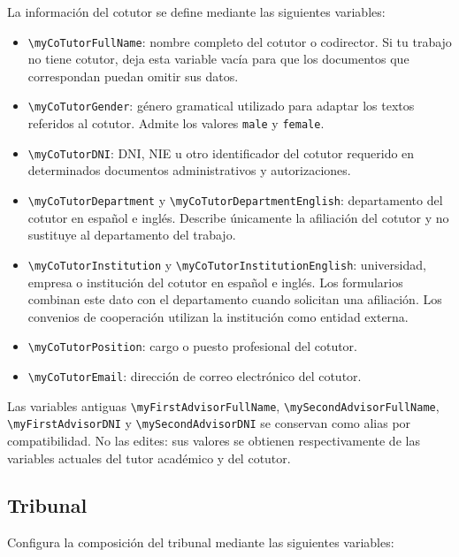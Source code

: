 La información del cotutor se define mediante las siguientes variables:

\begin{itemize}
  \item \texttt{\textbackslash{}myCoTutorFullName}: nombre completo del cotutor o codirector. Si tu trabajo no tiene cotutor, deja esta variable vacía para que los documentos que correspondan puedan omitir sus datos.
  \item \texttt{\textbackslash{}myCoTutorGender}: género gramatical utilizado para adaptar los textos referidos al cotutor. Admite los valores \texttt{male} y \texttt{female}.
  \item \texttt{\textbackslash{}myCoTutorDNI}: DNI, NIE u otro identificador del cotutor requerido en determinados documentos administrativos y autorizaciones.
  \item \texttt{\textbackslash{}myCoTutorDepartment} y \texttt{\textbackslash{}myCoTutorDepartmentEnglish}: departamento del cotutor en español e inglés. Describe únicamente la afiliación del cotutor y no sustituye al departamento del trabajo.
  \item \texttt{\textbackslash{}myCoTutorInstitution} y \texttt{\textbackslash{}myCoTutorInstitutionEnglish}: universidad, empresa o institución del cotutor en español e inglés. Los formularios combinan este dato con el departamento cuando solicitan una afiliación. Los convenios de cooperación utilizan la institución como entidad externa.
  \item \texttt{\textbackslash{}myCoTutorPosition}: cargo o puesto profesional del cotutor.
  \item \texttt{\textbackslash{}myCoTutorEmail}: dirección de correo electrónico del cotutor.
\end{itemize}

Las variables antiguas \texttt{\textbackslash{}myFirstAdvisorFullName}, \texttt{\textbackslash{}mySecondAdvisorFullName}, \texttt{\textbackslash{}myFirstAdvisorDNI} y \texttt{\textbackslash{}mySecondAdvisorDNI} se conservan como alias por compatibilidad. No las edites: sus valores se obtienen respectivamente de las variables actuales del tutor académico y del cotutor.

\subsection{Tribunal}
\label{sec:tribunal-configuracion}

Configura la composición del tribunal mediante las siguientes variables:

